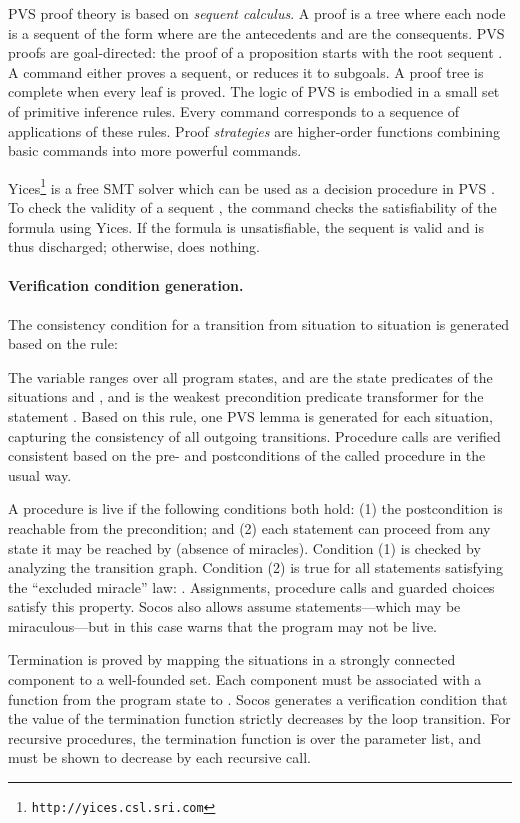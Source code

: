 \documentclass[english,submission]{eptcs}
\begin{document}
PVS proof theory is based on \emph{sequent calculus}. A proof is a
tree where each node is a sequent of the form 
where  are the antecedents and
 are the consequents. PVS proofs are
goal-directed: the proof of a proposition  starts with the
root sequent . A command either proves a sequent, or
reduces it to subgoals. A proof tree is complete when every leaf is
proved. The logic of PVS is embodied in a small set of primitive inference
rules. Every command corresponds to a sequence of applications of
these rules. Proof \emph{strategies} are higher-order functions combining
basic commands into more powerful commands.

Yices\footnote{\texttt{http://yices.csl.sri.com}} is a free SMT solver which can be used as a decision procedure in
PVS \cite{yices}. To check the validity of a sequent ,
the command \texttt{} checks the satisfiability
of the formula 
using Yices. If the formula is unsatisfiable, the sequent is valid
and is thus discharged; otherwise, \texttt{} does
nothing.


\paragraph{Verification condition generation.}

The consistency condition for a transition  from situation
 to situation  is generated based on the rule: 

The variable  ranges over all program states,  and
 are the state predicates of the situations  and ,
and  is the weakest precondition predicate transformer
for the statement . Based on this rule, one PVS lemma is
generated for each situation, capturing the consistency of all outgoing
transitions. Procedure calls are verified consistent based on the
pre- and postconditions of the called procedure in the usual way.

A procedure is live if the following conditions both hold: (1) the
postcondition is reachable from the precondition; and (2) each statement
can proceed from any state it may be reached by (absence of miracles).
Condition (1) is checked by analyzing the transition graph. Condition
(2) is true for all statements satisfying the {}``excluded miracle''
law: . Assignments,
procedure calls and guarded choices satisfy this property. Socos
also allows assume statements---which may be miraculous---but in this
case warns that the program may not be live.

Termination is proved by mapping the situations in a strongly connected
component to a well-founded set. Each component must be associated
with a function from the program state to . Socos generates
a verification condition that the value of the termination function
strictly decreases by the loop transition. For recursive procedures,
the termination function is over the parameter list, and must be shown
to decrease by each recursive call.
\end{document}
